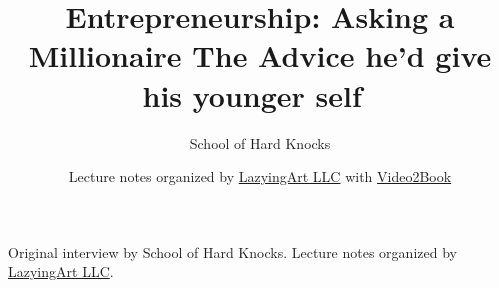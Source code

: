 \documentclass[11pt,oneside]{book}
\begin{document}
\frontmatter
\title{Entrepreneurship: Asking a Millionaire The Advice he'd give his younger self🧠🤯}
\author{School of Hard Knocks}
\date{Lecture notes organized by \href{https://lazying.art}{LazyingArt LLC} with \href{https://github.com/lachlanchen/Video2Book}{Video2Book}}
\maketitle
\begin{center}
\small Original interview by School of Hard Knocks. Lecture notes organized by \href{https://lazying.art}{LazyingArt LLC}.
\end{center}
\clearpage
\mainmatter

\end{document}
